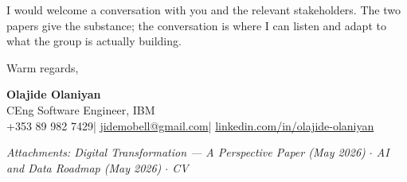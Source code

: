 \documentclass[10pt]{article}
\newcommand{\spacer}{\vspace{10pt}}
\newcommand{\bigspacer}{\vspace{16pt}}
\begin{document}
\spacer
I would welcome a conversation with you and the relevant stakeholders. The
two papers give the substance; the conversation is where I can listen and
adapt to what the group is actually building.

\bigspacer

Warm regards,

\vspace{18pt}

\textbf{Olajide Olaniyan}\\
{\small CEng Software Engineer, IBM}\\
{\small +353 89 982 7429\quad|\quad
\href{mailto:jidemobell@gmail.com}{jidemobell@gmail.com}\quad|\quad
\href{https://linkedin.com/in/olajide-olaniyan}{linkedin.com/in/olajide-olaniyan}}

\spacer
{\small\color{darkgrey}
\textit{Attachments: Digital Transformation --- A Perspective Paper (May 2026)
$\cdot$ AI and Data Roadmap (May 2026) $\cdot$ CV}
}
\end{document}
